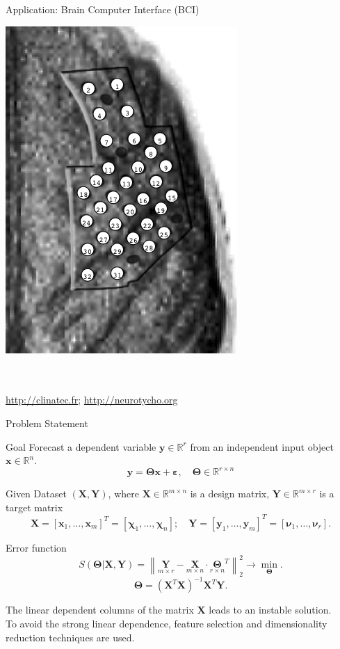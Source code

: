 \documentclass[9pt]{beamer}
\newcommand{\bx}{\mathbf{x}}
\newcommand{\by}{\mathbf{y}}
\newcommand{\bY}{\mathbf{Y}}
\newcommand{\bX}{\mathbf{X}}
\newcommand{\bbR}{\mathbb{R}}
\newcommand{\bchi}{\boldsymbol{\chi}}
\newcommand{\bnu}{\boldsymbol{\nu}}
\newcommand{\bTheta}{\boldsymbol{\Theta}}
\begin{document}
\begin{frame}{Application: Brain Computer Interface (BCI)}
\begin{minipage}{0.55\linewidth}
	\includegraphics[width=0.73\linewidth]{figs/electrodes}
\end{minipage}
\vspace{0.1cm} \\
\hrulefill \\
\url{http://clinatec.fr}; 
\url{http://neurotycho.org}
\end{frame}
\begin{frame}{Problem Statement}
	\begin{block}{Goal}
	Forecast a dependent variable $\by \in \bbR^r$ from an independent input object $\bx \in \bbR^n$.
	\[
	\by = \bTheta \bx+ \boldsymbol{\varepsilon}, \quad \bTheta \in \bbR^{r \times n}
	\]
	\vspace{-0.7cm}
	\end{block}
	\begin{block}{Given}
	Dataset $\left( \bX, \bY \right)$, where $\bX \in \bbR^{m \times n}$ is a design matrix, $\bY \in \bbR^{m \times r}$ is a target matrix
	\[
	\bX = [\bx_1, \dots, \bx_m]^{T} =  [\bchi_1, \dots, \bchi_n]; \quad \bY = [\by_1, \dots, \by_m]^{T} =  [\bnu_1, \dots, \bnu_r].
	\]
	\vspace{-0.7cm}
	\end{block}
	\begin{block}{Error function}
	\[
	S(\bTheta | \bX, \bY) = {\left\| \underset{m \times r}{\mathbf{Y}}  - \underset{m \times n}{\bX} \cdot \underset{r \times n}{\bTheta}^T \right\| }_2^2 \rightarrow\min_{\bTheta}.
	\label{eq:error_function}
	\]
	\[
	\bTheta = (\bX^{T} \bX)^{-1} \bX^{T} \bY.
	\]
	\end{block}
	The linear dependent columns of the matrix $\bX$ leads to an instable solution. \\
	To avoid the strong linear dependence, feature selection and dimensionality reduction techniques are used.
\end{frame}
\end{document}

